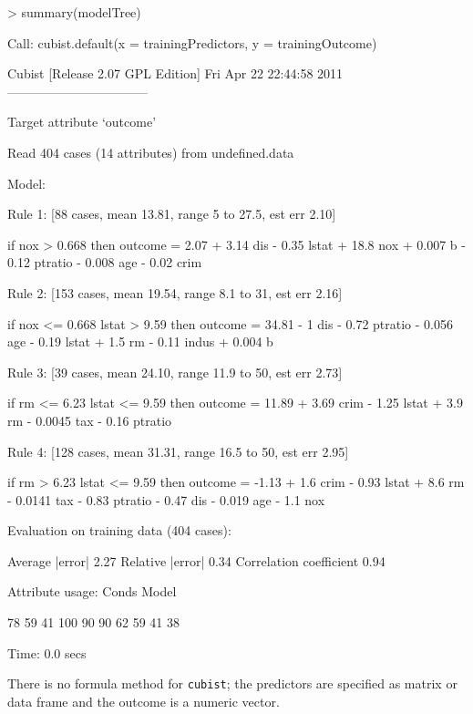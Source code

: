 \documentclass[12pt]{article}
\newcommand{\code}[1]{\mbox{\footnotesize\color{darkblue}\texttt{#1}}}
\renewenvironment{Schunk}{\vspace{\topsep}}{\vspace{\topsep}}
\begin{document}
\begin{Schunk}
\begin{Sinput}
> summary(modelTree)
\end{Sinput}
\begin{Soutput}
Call:
cubist.default(x = trainingPredictors, y = trainingOutcome)


Cubist [Release 2.07 GPL Edition]  Fri Apr 22 22:44:58 2011
---------------------------------

    Target attribute `outcome'

Read 404 cases (14 attributes) from undefined.data

Model:

  Rule 1: [88 cases, mean 13.81, range 5 to 27.5, est err 2.10]

    if
	nox > 0.668
    then
	outcome = 2.07 + 3.14 dis - 0.35 lstat + 18.8 nox + 0.007 b
	          - 0.12 ptratio - 0.008 age - 0.02 crim

  Rule 2: [153 cases, mean 19.54, range 8.1 to 31, est err 2.16]

    if
	nox <= 0.668
	lstat > 9.59
    then
	outcome = 34.81 - 1 dis - 0.72 ptratio - 0.056 age - 0.19 lstat + 1.5 rm
	          - 0.11 indus + 0.004 b

  Rule 3: [39 cases, mean 24.10, range 11.9 to 50, est err 2.73]

    if
	rm <= 6.23
	lstat <= 9.59
    then
	outcome = 11.89 + 3.69 crim - 1.25 lstat + 3.9 rm - 0.0045 tax
	          - 0.16 ptratio

  Rule 4: [128 cases, mean 31.31, range 16.5 to 50, est err 2.95]

    if
	rm > 6.23
	lstat <= 9.59
    then
	outcome = -1.13 + 1.6 crim - 0.93 lstat + 8.6 rm - 0.0141 tax
	          - 0.83 ptratio - 0.47 dis - 0.019 age - 1.1 nox


Evaluation on training data (404 cases):

    Average  |error|               2.27
    Relative |error|               0.34
    Correlation coefficient        0.94


	Attribute usage:
	  Conds  Model

	   78%   100%    lstat
	   59%    53%    nox
	   41%    78%    rm
	         100%    ptratio
	          90%    age
	          90%    dis
	          62%    crim
	          59%    b
	          41%    tax
	          38%    indus


Time: 0.0 secs
\end{Soutput}
\end{Schunk}
There is no formula method for \code{cubist}; the predictors are specified as matrix or data frame and the outcome is a numeric vector.
\end{document}
